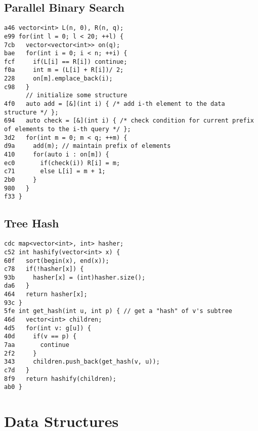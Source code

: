 \documentclass[10pt, a4paper, twoside]{article}
\begin{document}
\subsection{Parallel Binary Search}
\begin{lstlisting}
a46 vector<int> L(n, 0), R(n, q);
e99 for(int l = 0; l < 20; ++l) {
7cb   vector<vector<int>> on(q);
bae   for(int i = 0; i < n; ++i) {
fcf     if(L[i] == R[i]) continue;
f0a     int m = (L[i] + R[i])/ 2;
228     on[m].emplace_back(i);
c98   }
      // initialize some structure
4f0   auto add = [&](int i) { /* add i-th element to the data structure */ };
694   auto check = [&](int i) { /* check condition for current prefix of elements to the i-th query */ };
3d2   for(int m = 0; m < q; ++m) {
d9a     add(m); // maintain prefix of elements
410     for(auto i : on[m]) {
ec0       if(check(i)) R[i] = m;
c71       else L[i] = m + 1;
2b0     }
980   }
f33 }
\end{lstlisting}

\subsection{Tree Hash}
\begin{lstlisting}
cdc map<vector<int>, int> hasher;
c52 int hashify(vector<int> x) {
60f   sort(begin(x), end(x));
c78   if(!hasher[x]) {
93b     hasher[x] = (int)hasher.size();
da6   }
464   return hasher[x];
93c }
5fe int get_hash(int u, int p) { // get a "hash" of v's subtree
46d   vector<int> children;
4d5   for(int v: g[u]) {
40d     if(v == p) {
7aa       continue
2f2     }
343     children.push_back(get_hash(v, u));
c7d   }
8f9   return hashify(children);
ab0 }
\end{lstlisting}



%
%

\section{Data Structures}
\end{document}
